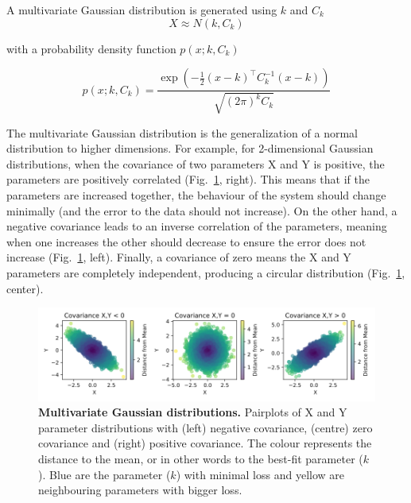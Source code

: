A multivariate Gaussian distribution is generated using $k$ and $C_{k}$
\begin{equation}
    X \approx N(k,C_k)
\end{equation}

with a probability density function $p(x;k,C_k )$

\begin{equation}
    p(x;k,C_k )= \frac{\exp\left(-\frac{1}{2} (x - k)^\top C_k^{-1} (x - k)\right)}{\sqrt{(2\pi)^k C_k}}
\end{equation}

The multivariate Gaussian distribution is the generalization of a normal distribution to higher dimensions.
For example, for 2-dimensional Gaussian distributions,
when the covariance of two parameters X and Y is positive, the parameters are positively correlated
(Fig.~\ref{fig:multivariate_gaussians}, right).
This means that if the parameters are increased together, the behaviour of the system should change minimally
(and the error to the data should not increase).
On the other hand, a negative covariance leads to an inverse correlation of the parameters,
meaning when one increases the other should decrease to ensure the error does not increase
(Fig.~\ref{fig:multivariate_gaussians}, left).
Finally, a covariance of zero means the X and Y parameters are completely independent,
producing a circular distribution (Fig.~\ref{fig:multivariate_gaussians}, center).

\begin{figure}[H] %
    \centering
    \begin{adjustbox}{center}
        \includegraphics[width=1\textwidth]{chapters/Chapter 2/multivariate_gaussians} %
    \end{adjustbox}
    \caption{\textbf{Multivariate Gaussian distributions.} Pairplots of X and Y parameter distributions with (left) negative covariance, (centre) zero covariance and (right) positive covariance.
    The colour represents the distance to the mean, or in other words to the best-fit parameter ($k$).
    Blue are the parameter ($k$) with minimal loss and yellow are neighbouring parameters with bigger loss.}
    \label{fig:multivariate_gaussians} %
\end{figure}

